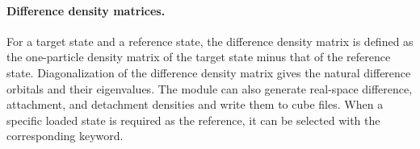 \paragraph{Difference density matrices.}
For a target state and a reference state, the difference density matrix is defined as the one-particle density matrix of the target state minus that of the reference state. Diagonalization of the difference density matrix gives the natural difference orbitals and their eigenvalues.
The module can also generate real-space difference, attachment, and detachment densities and write them to cube files. When a specific loaded state is required as the reference, it can be selected with the corresponding  keyword.
